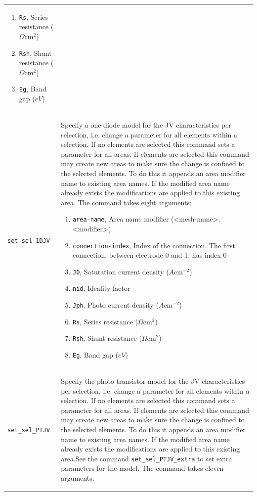 \documentclass[noshowpacs,preprintnumbers,amsmath,amssymb, letter]{revtex4}
\begin{document}
\begin{longtable}{p{}p{}}
\begin{enumerate}
\item \texttt{Rs}, Series resistance ($\Omega \text{cm}^2$)
\item \texttt{Rsh}, Shunt resistance ($\Omega \text{cm}^2$)
\item \texttt{Eg}, Band gap ($eV$)
\end{enumerate}\\
\texttt{set\_sel\_1DJV}	&  Specify a one-diode model for the JV characteristics per selection, i.e. change a parameter for all elements within a selection. If no elements are selected this command sets a parameter for all areas. If elements are selected this command may create new areas to make sure the change is confined to the selected elements. To do this it appends an area modifier name to existing area names. If the modified area name already exists the modifications are applied to this existing area. The command takes eight arguments:
\begin{enumerate}
\item \texttt{area-name}, Area name modifier (\textless mesh-name\textgreater .\textless modifier\textgreater )
\item \texttt{connection-index}, Index of the connection. The first connection, between electrode 0 and 1,  has index 0
\item \texttt{J0}, Saturation current density ($A \text{cm}^{-2}$)
\item \texttt{nid}, Ideality factor
\item \texttt{Jph}, Photo current density ($A \text{cm}^{-2}$)
\item \texttt{Rs}, Series resistance ($\Omega \text{cm}^2$)
\item \texttt{Rsh}, Shunt resistance ($\Omega \text{cm}^2$)
\item \texttt{Eg}, Band gap ($eV$)
\end{enumerate}\\
\texttt{set\_sel\_PTJV}	&  Specify the photo-transistor model for the JV characteristics per selection, i.e. change a parameter for all elements within a selection. If no elements are selected this command sets a parameter for all areas. If elements are selected this command may create new areas to make sure the change is confined to the selected elements. To do this it appends an area modifier name to existing area names. If the modified area name already exists the modifications are applied to this existing area.See the command \texttt{set\_sel\_PTJV\_extra} to set extra parameters for the model. The command takes eleven arguments:
\begin{enumerate}

\end{enumerate}
\end{longtable}
\end{document}
